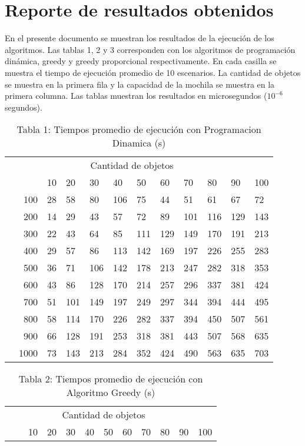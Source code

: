 \documentclass{article}
\begin{document}
\section*{Reporte de resultados obtenidos}
En el presente documento se muestran los resultados de la ejecución de los algoritmos. Las tablas 1, 2 y 3 corresponden con los algoritmos de programación dinámica, greedy y greedy proporcional respectivamente. En cada casilla se muestra el tiempo de ejecución promedio de 10 escenarios. La cantidad de objetos se muestra en la primera fila y la capacidad de la mochila se muestra en la primera columna. Las tablas muestran los resultados en microsegundos ($10^{-6}$ segundos).
\begin{center}
\begin{table}[ht]
\centering
\caption*{Tabla 1: Tiempos promedio de ejecución con Programacion Dinamica (\textmu s)}
\label{1}
\begin{tabularx}{0.8\textwidth}{Xr|XXXXXXXXXX}
&\multicolumn{10}{c}{Cantidad de objetos} \\
&&10&20&30&40&50&60&70&80&90&100\\\hline
\parbox[t]{2mm}{}&100&28&58&80&106&75&44&51&61&67&72\\
&200&14&29&43&57&72&89&101&116&129&143\\
&300&22&43&64&85&111&129&149&170&191&213\\
&400&29&57&86&113&142&169&197&226&255&283\\
&500&36&71&106&142&178&213&247&282&318&353\\
&600&43&86&128&170&214&257&296&337&381&424\\
&700&51&101&149&197&249&297&344&394&444&495\\
&800&58&114&170&226&282&337&394&450&507&561\\
&900&66&128&191&253&318&381&443&507&568&635\\
&1000&73&143&213&284&352&424&490&563&635&703\\
\end{tabularx}
\end{table}
\begin{table}[ht]
\centering
\caption*{Tabla 2: Tiempos promedio de ejecución con Algoritmo Greedy (\textmu s)}
\label{2}
\begin{tabularx}{0.8\textwidth}{Xr|XXXXXXXXXX}
&\multicolumn{10}{c}{Cantidad de objetos} \\
&&10&20&30&40&50&60&70&80&90&100\\\hline

\end{tabularx}
\end{table}
\end{center}
\end{document}
